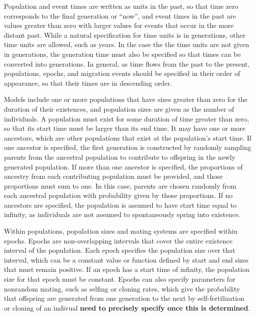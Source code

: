 \documentclass[11pt]{article}
\begin{document}
Population and event times are written as units in the past, so that time zero
corresponds to the final generation or ``now'', and event times in the past are
values greater than zero with larger values for events that occur in the more
distant past. While a natural specification for time units is in generations,
other time units are allowed, such as years. In the case the the time units are
not given in generations, the generation time must also be specified so that
times can be converted into generations. In general, as time flows from the
past to the present, populations, epochs, and migration events should be
specified in their order of appearance, so that their times are in descending
order.

Models include one or more populations that have sizes greater than zero for
the duration of their existences, and population sizes are given as the number
of individuals. A population must exist for some duration of time greater than
zero, so that its start time must be larger than its end time. It may have one
or more ancestors, which are other populations that exist at the population's
start time. If one ancestor is specified, the first generation is constructed
by randomly sampling parents from the ancestral population to contribute to
offspring in the newly generated population. If more than one ancestor is
specified, the proportions of ancestry from each contributing population must
be provided, and those proportions must sum to one. In this case, parents are
chosen randomly from each ancestral population with probability given by those
proportions. If no ancestors are specified, the population is assumed to have
start time equal to infinity, as individuals are not assumed to spontaneously
spring into existence.

Within populations, population sizes and mating systems are specified within
epochs. Epochs are non-overlapping intervals that cover the entire existence
interval of the population. Each epoch specifies the population size over that
interval, which can be a constant value or function defined by start and end
sizes that must remain positive.  If an epoch has a start time of infinity, the
population size for that epoch must be constant. Epochs can also specify
parameters for nonrandom mating, such as selfing or cloning rates, which give
the probability that offspring are generated from one generation to the next by
self-fertilization or cloning of an indivual \textbf{need to precisely specify
once this is determined}.
\end{document}
